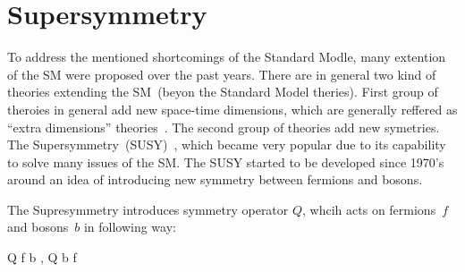 




\section{Supersymmetry}

To address the mentioned shortcomings of the Standard Modle, many extention of the SM were proposed over the past years. There are in general two kind of theories extending the SM~(beyon the Standard Model theries). First group of theroies in general add new space-time dimensions, which are generally reffered as ``extra dimensions'' theories~\cite{Patrignani:2016xqp}. The second group of theories add new symetries. The Supersymmetry~(SUSY)~\cite{Martin:1997ns}, which became very popular due to its capability to solve many issues of the SM. The SUSY started to be developed since 1970's around an idea of introducing new symmetry between fermions and bosons.
  

The Supresymmetry introduces symmetry operator $Q$, whcih acts on fermions~$f$ and bosons~$b$ in following way:

{
Q \mid f \rangle \to \mid b \rangle \to  , \; Q \mid b \rangle \to \mid f \rangle
}

